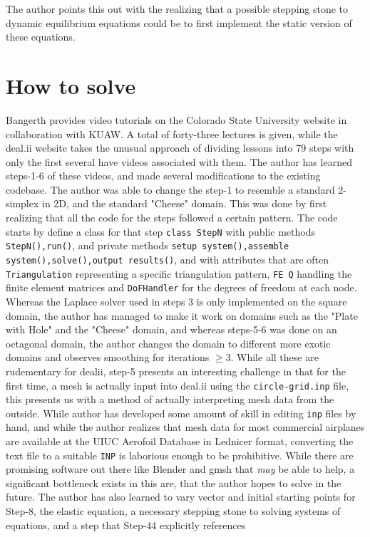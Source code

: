 \documentclass{article}
\begin{document}
The author points this out with the realizing that a possible stepping stone to dynamic equilibrium equations could be to first implement the static version of these equations.
\section{How to solve}
Bangerth provides video tutorials on the Colorado State University website in collaboration with KUAW. A total of forty-three lectures is given, while the deal.ii website takes the unusual approach of dividing lessons into 79 steps with only the first several have videos associated with them.
\newline
\newline
The author has learned steps-1-6 of these videos, and made several modifications to the existing codebase. The author was able to change the step-1 to resemble a standard 2-simplex in 2D, and the standard "Cheese" domain.
\newline
\newline
This was done by first realizing that all the code for the steps followed a certain pattern. The code starts by define a class for that step \texttt{class StepN} with public methods \texttt{StepN(),run()}, and private methods \texttt{setup system(),assemble system(),solve(),output results()}, and with attributes that are often \texttt{Triangulation} representing a specific triangulation pattern, \texttt{FE Q} handling the finite element matrices and \texttt{DoFHandler} for the degrees of freedom at each node.
\newline
\newline
Whereas the Laplace solver used in steps 3 is only implemented on the square domain, the author has managed to make it work on domains such as the "Plate with Hole" and the "Cheese" domain, and whereas steps-5-6 was done on an octagonal domain, the author changes the domain to different more exotic domains and observes smoothing for iterations $\geq 3$. 
\newline
\newline
While all these are rudementary for dealii, step-5 presents an interesting challenge in that for the first time, a mesh is actually input into deal.ii using the \texttt{circle-grid.inp} file, this presents us with a method of actually interpreting mesh data from the outside. While author has developed some amount of skill in editing \texttt{inp} files by hand, and while the author realizes that mesh data for most commercial airplanes are available at the UIUC Aerofoil Database in Lednicer format, converting the text file to a suitable \texttt{INP} is laborious enough to be prohibitive. While there are promising software out there like Blender and gmsh that \textit{may} be able to help, a significant bottleneck exists in this are, that the author hopes to solve in the future.
\newline
The author has also learned to vary vector and initial starting points for Step-8, the elastic equation, a necessary stepping stone to solving systems of equations, and a step that Step-44 explicitly references
\end{document}
